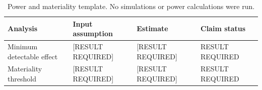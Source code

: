 \begin{table}[t]
\centering
\caption{Power and materiality template. No simulations or power calculations were run.}
\begin{tabular}{llll}
\toprule
Analysis & Input assumption & Estimate & Claim status \\
\midrule
Minimum detectable effect & [RESULT REQUIRED] & [RESULT REQUIRED] & RESULT REQUIRED \\
Materiality threshold & [RESULT REQUIRED] & [RESULT REQUIRED] & RESULT REQUIRED \\
\bottomrule
\end{tabular}
\end{table}
